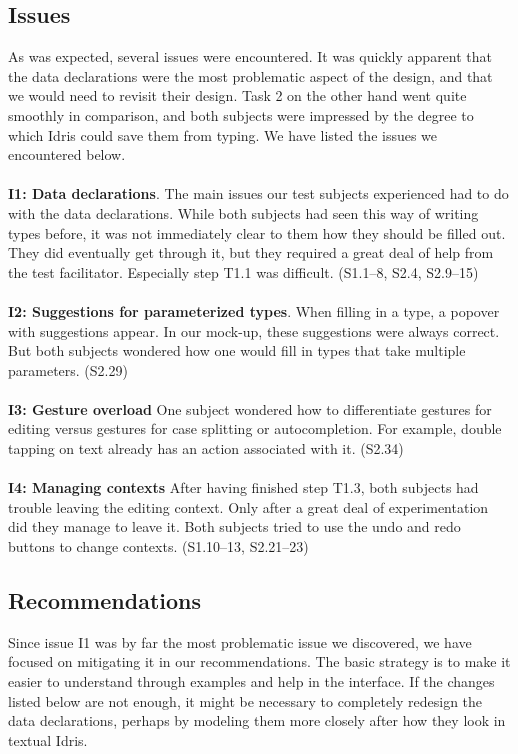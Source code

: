 \subsection{Issues}
\label{sec:first_issues}
As was expected, several issues were encountered. It was quickly apparent that
the data declarations were the most problematic aspect of the design, and that
we would need to revisit their design. Task 2 on the other hand went quite
smoothly in comparison, and both subjects were impressed by the degree to
which Idris could save them from typing. We have listed the issues we
encountered below. \\ \\
\textbf{I1: Data declarations}.
The main issues our test subjects experienced had to do with the data
declarations. While both subjects had seen this way of writing types
before, it was not immediately clear to them how they should be filled out.
They did eventually get through it, but they required a great deal of help
from the test facilitator. Especially step T1.1 was difficult. (S1.1--8, S2.4, S2.9--15)\\ \\
\textbf{I2: Suggestions for parameterized types}.
When filling in a type, a popover with suggestions appear. In our mock-up,
these suggestions were always correct. But both subjects wondered how one would
fill in types that take multiple parameters. (S2.29) \\ \\
\textbf{I3: Gesture overload}
One subject wondered how to differentiate gestures for editing versus
gestures for case splitting or autocompletion. For example, double tapping on
text already has an action associated with it. (S2.34) \\ \\
\textbf{I4: Managing contexts}
After having finished step T1.3, both subjects had trouble leaving the editing
context. Only after a great deal of experimentation did they manage to leave
it. Both subjects tried to use the undo and redo buttons to change contexts.
(S1.10--13, S2.21--23)

\subsection{Recommendations}
\label{sec:first_recommendations}
Since issue I1 was by far the most problematic issue we discovered, we have
focused on mitigating it in our recommendations. The basic strategy is to make
it easier to understand through examples and help in the interface. If the
changes listed below are not enough, it might be necessary to completely
redesign the data declarations, perhaps by modeling them more closely after how
they look in textual Idris.


